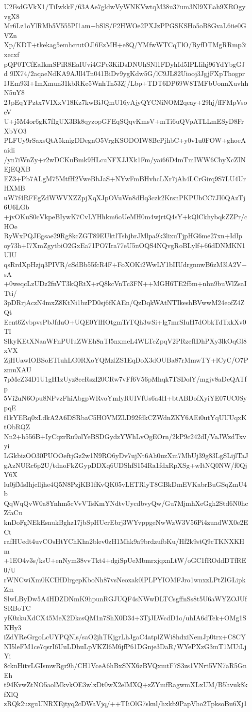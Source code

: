 U2FsdGVkX1/TiIwkkF/63AAe7gldwVyWNKVwtqM38u37um3Nl9XEah9XROgyvgX8
Mr6Lz1oYlRMb5V555PI1am+bSlS/F2HWOe2PXJzPPGSKSHo5oB8GvaL6iie0GVZn
Xp/KDT+tkekag5emhcrutOJl6EzMH+e8Q/YMfwWTCqTlO/RyfDTMgRRmp3ixecxf
pQP0TCfEaIkmSPiR8EaIUvi4GPc3KiDsDNUhSNl1FDyhId5IPLIihj96YdYbgGJd
9lX74/2aqaeNdKA9AJll4Tn041BiDv9ygKdw5G/lC9JL82Uiooj3JgjFXpThogpr
IJEm93I+ImXmun31kbRKe5WnhTn53Zj/Lbp+TDT6DP69W8TMFbUonnXuvhhN5uY8
2JpEqYPztx7VIXxV18Kz7kwBiJQmU16yAjyQYCNiNOM2qeay+29hj/ffFMpVsoeV
U+j5M4or6gK7fIgUX3Bk8qyzopGFEqSQqvKmsV+mTi6uQVpATLLmESyD8FrXbYO3
PLFUy9rSaxsQtA5knigDDegnO5VrgKSODOIW8BcPjhbC+y0v1u0FOW+ghoeAaidi
/yn7iWnZy+r2wDCKuBmk9HLcuNFXJJXk1Fm/yai66D4mTmIWW6ChyXcZINEjEQXB
EZ3+Pb7ALgM75MtfH2VweBbJaS+NYwFmBHvhcLXr7jAh4LCrGirq9S7LU4UrHXMB
uW7f4RFEgZdWWVXZZpjXqXJpOVuWn8dHq3czk2KrsnPKPUbCC7JI0QAzTj6U6LGb
+jvOKuS0cVkpeBIywK7CvLYHhkm6oUeMH0m4wjrtQ4sY+kQlCkhybqkZZPr/cHOe
RyWxPQJEgsae29Rg8kcZGT89EUktlTshjbrJMlpa9k3lixuTjpHG6me27xn+IdIp
oy73h+I7XmZgytbiO2GxEa71PO7Ira77eU5nOQS4NQvgRoBLylf+66dDNMKN1UIU
qsRrdXpHzjq3PIVR/cSdBb55fcR4F+FoXOKi2WwLY1bIIUdrgnnwB6zM3lA2V+sA
+0weqcLzUDz2fnVT3kQRtX+rQ8kcVnTc3FN++MGH6TE2f5m+nhn9buWlZsaITti/
3pDRrjAczN4mxZ8KtNi1bzPD0sj6fKAEn/QzDqkWAtNTIkeshBVwwM24eofZ4ZQt
Eent6ZvbpvsPbJfduO+UQE0YlHOtgmTrTQh3wSi+lg7mrSIuH7dObkTdTxkXv0TI
SlkyKEtXNaaWFnPUIuZWEh8nTl5nxmeL4WLTcZpqV2PRzefIDhPXy3lkOqGl8xVX
ZjHUawIOBSoETIuhLG0RXoYQMzlZS1EqDoX3dOUBa87rMmwTY+lCyC/O7PzmuXAU
7pMcZ34D1U1gH1zUyz8ceRszI20CRw7vFf6V56pMhqk7TSDolY/mgjv8aDeQATfp
5Vi2uN6Opu8NPvzFhiAbgpWRvoYmIyRUIVfUs6a4H+btABDofXyiYE07UC0SypqE
f1kYERq0xLdkA2A6DSRbaC5HOVMZLD92fdkCZWdnZKY6AEi0utYqUUUqxKtObRQZ
Nn2+h556B+IyCqzrRu9olYeBSDGydzYWhLvOgEOrn/2kP9c242dI/VaJWzdTxvyi
LGkbizOO30PUOOeftjGz2w1N9RO6yDv7ujNt6Ah0uzXm7MbUj39g83LgSLijlTaJ
gAzNURc6p2U/tdnoFkZGypDDXq6UDShfS154Ra1fdxRpXSg+wItNQ0NW/f0QjY6X
lu0jfMsIhjclljhe4Q5N8PzjKB1fKvQK05vLETRlyT8GBkDmEVKabrBuGSqZmU4b
QqWqQvW0a8Ynhm5cVvVTsKmYNdtvUycdbvyQw/Gu7MjmhXeGgh2Std6N0hcZfaCu
knDoFgNEkEsnukBghz17jbSpHUcrEbrj3WYvppgeNwWzW3V56Pi4zundWX0e2ECt
rafHUedt4uvCOsHtYChKha2blev0zH1Mhk9a9brdzufbKu/Hf2k9stQ9cTKNXKHm
+1EO4v3s/ksU+enNym38vvTkt4+dgiSpUeMbmrxjqxnLtW/oGC1fROddDTfRE0/U
rWNCwiXm0KCIHDlrgepKboNh87vsNeoxak0lPLPYIOMFJro1wnxzLPtZlGLipkZm
SlwLByDw5A4HDZDNmK9hpunRGJUQF4sNWwDLTCsgffnSs8t5U6aWYZOJUfSRBoTC
yK0zkuXdCX45MeX2DkcsQM1n7ShX0D34+3TjJLWcdD1o/uhIA6dTek+OMg1SKHy3
iZdYReGrgoLcUYPQNls/saO2jhTKjgrLhJgaC4atplZWi8hdxiNemJp0trx+C8CY
NI5leFM1ce7qsrI6UuLDbuLpVKZl6M6jfP61DGnje3DaR/WYePXzG3mT1MUiLjYi
8cknHitvLGIsmwRgr9h/CH1VceA6hBxSNX6zBVQxmtF7S3zs1VNrt5VN7aR5GnEh
t94KvwZtNO5aolMkvkOE3wlxDt0wX2elMXQ+zZYmfRagwmXLxUM/B5hvuk8kfXlQ
zRQk2uzguUNRXEjtyq2cDWaVjq/++TIiOlG7sknl/hxkb9PapVho2TpksoBu6Xj1
